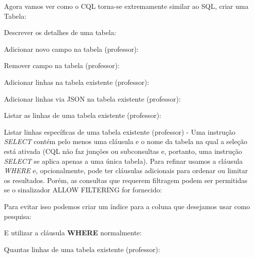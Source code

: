 Agora vamos ver como o CQL torna-se extremamente similar ao SQL, criar uma Tabela: \\

Descrever os detalhes de uma tabela: \\

Adicionar novo campo na tabela (professor): \\

Remover campo na tabela (professor): \\

Adicionar linhas na tabela existente (professor): \\

Adicionar linhas via JSON na tabela existente (professor): \\

Listar as linhas de uma tabela existente (professor): \\

Listar linhas específicas de uma tabela existente (professor) - Uma instrução \textit{SELECT} contém pelo menos uma cláusula e o nome da tabela na qual a seleção está ativada (CQL não faz junções ou subconsultas e, portanto, uma instrução \textit{SELECT} se aplica apenas a uma única tabela). Para refinar usamos a cláusula \textit{WHERE} e, opcionalmente, pode ter cláusulas adicionais para ordenar ou limitar os resultados. Porém, as consultas que requerem filtragem podem ser permitidas se o sinalizador ALLOW FILTERING for fornecido: \\

Para evitar isso podemos criar um índice para a coluna que desejamos usar como pesquisa: \\

E utilizar a cláusula \textbf{WHERE} normalmente: \\

Quantas linhas de uma tabela existente (professor): \\

